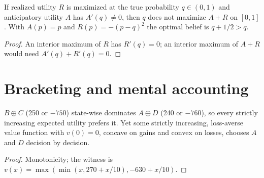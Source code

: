 \begin{theorem}
\label{thm:beh-bp}
\leanok
If realized utility $R$ is maximized at the true probability $q\in(0,1)$ and anticipatory utility $A$ has $A'(q)\ne0$,
then $q$ does not maximize $A+R$ on $[0,1]$. With $A(p)=p$ and $R(p)=-(p-q)^2$ the optimal belief is $q+1/2>q$.
\end{theorem}
\begin{proof}
\leanok
An interior maximum of $R$ has $R'(q)=0$; an interior maximum of $A+R$ would need $A'(q)+R'(q)=0$.
\end{proof}

\section{Bracketing and mental accounting}

\begin{theorem}
\label{thm:beh-bracket}
\leanok
$B\oplus C$ (250 or $-750$) state-wise dominates $A\oplus D$ (240 or $-760$), so every strictly increasing
expected utility prefers it. Yet some strictly increasing, loss-averse value function with $v(0)=0$, concave on gains
and convex on losses, chooses $A$ and $D$ decision by decision.
\end{theorem}
\begin{proof}
\leanok
Monotonicity; the witness is $v(x)=\max(\min(x,270+x/10),-630+x/10)$.
\end{proof}

